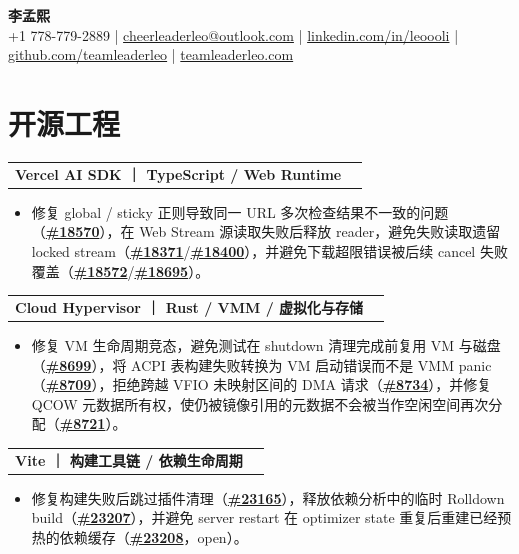 \documentclass[UTF8,a4paper,11pt,fontset=none]{ctexart}
\makeatletter
\newcommand{\subroleline}[2]{%
  \vspace{-0.35pt}%
  \begin{tabularx}{\textwidth}{@{}Xr@{}}
    {\sffamily\bfseries\fontsize{10.2pt}{11.45pt}\selectfont #1} & {\sffamily\fontsize{8.65pt}{10.1pt}\selectfont #2}
  \end{tabularx}\vspace{-0.2pt}
}
\newcommand{\resumeliststart}{\begin{itemize}[leftmargin=1.42em,label=\textbullet,itemsep=0pt,parsep=0pt,topsep=-0.05pt,partopsep=0pt]}
\newcommand{\resumeitem}[1]{\item\fontsize{10.12pt}{10.68pt}\selectfont\RaggedRight #1}
\newcommand{\resumelistend}{\end{itemize}\vspace{0pt}}
\makeatother
\begin{document}
\begin{center}
  {\sffamily\bfseries\fontsize{18.6pt}{20.5pt}\selectfont 李孟熙}\\[0.65pt]
  {\sffamily\fontsize{8.35pt}{9.35pt}\selectfont
  +1 778-779-2889 \;|\;
  \href{mailto:cheerleaderleo@outlook.com}{cheerleaderleo@outlook.com} \;|\;
  \href{https://www.linkedin.com/in/leoooli/}{linkedin.com/in/leoooli} \;|\;
  \href{https://github.com/teamleaderleo}{github.com/teamleaderleo} \;|\;
  \href{https://teamleaderleo.com/}{teamleaderleo.com}}
\end{center}
\vspace{-3.0pt}

\section{开源工程}

\subroleline{Vercel AI SDK ｜ TypeScript / Web Runtime}{2026.08}
\resumeliststart
  \resumeitem{修复 global / sticky 正则导致同一 URL 多次检查结果不一致的问题（\href{https://redirect.github.com/vercel/ai/pull/18570}{\textbf{\#18570}}），在 Web Stream 源读取失败后释放 reader，避免失败读取遗留 locked stream（\href{https://redirect.github.com/vercel/ai/pull/18371}{\textbf{\#18371}}/\href{https://redirect.github.com/vercel/ai/pull/18400}{\textbf{\#18400}}），并避免下载超限错误被后续 cancel 失败覆盖（\href{https://redirect.github.com/vercel/ai/pull/18572}{\textbf{\#18572}}/\href{https://redirect.github.com/vercel/ai/pull/18695}{\textbf{\#18695}}）。}
\resumelistend

\subroleline{Cloud Hypervisor ｜ Rust / VMM / 虚拟化与存储}{2026.08}
\resumeliststart
  \resumeitem{修复 VM 生命周期竞态，避免测试在 shutdown 清理完成前复用 VM 与磁盘（\href{https://redirect.github.com/cloud-hypervisor/cloud-hypervisor/pull/8699}{\textbf{\#8699}}），将 ACPI 表构建失败转换为 VM 启动错误而不是 VMM panic（\href{https://redirect.github.com/cloud-hypervisor/cloud-hypervisor/pull/8709}{\textbf{\#8709}}），拒绝跨越 VFIO 未映射区间的 DMA 请求（\href{https://redirect.github.com/cloud-hypervisor/cloud-hypervisor/pull/8734}{\textbf{\#8734}}），并修复 QCOW 元数据所有权，使仍被镜像引用的元数据不会被当作空闲空间再次分配（\href{https://redirect.github.com/cloud-hypervisor/cloud-hypervisor/pull/8721}{\textbf{\#8721}}）。}
\resumelistend

\subroleline{Vite ｜ 构建工具链 / 依赖生命周期}{2026.08}
\resumeliststart
  \resumeitem{修复构建失败后跳过插件清理（\href{https://redirect.github.com/vitejs/vite/pull/23165}{\textbf{\#23165}}），释放依赖分析中的临时 Rolldown build（\href{https://redirect.github.com/vitejs/vite/pull/23207}{\textbf{\#23207}}），并避免 server restart 在 optimizer state 重复后重建已经预热的依赖缓存（\href{https://redirect.github.com/vitejs/vite/pull/23208}{\textbf{\#23208}}，open）。}
\resumelistend
\end{document}
